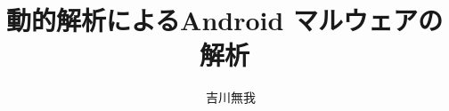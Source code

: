 
\renewcommand{\baselinestretch}{0.5}

\title{動的解析によるAndroid マルウェアの解析}
\author{~~吉川無我}

\pagestyle{headings}

\def\figlabel#1{\label{fig:#1}}
\def\tablabel#1{\label{tab:#1}}
\def\chaplabel#1{\label{chap:#1}}
\def\seclabel#1{\label{sec:#1}}
\def\applabel#1{\label{app:#1}}

\def\figref#1{図~\ref{fig:#1}}
\def\tabref#1{表~\ref{tab:#1}}
\def\chapref#1{第~\ref{chap:#1}章}
\def\secref#1{第~\ref{sec:#1}節}
\def\appref#1{付録~\ref{app:#1}}

\def\labelenumi{(\theenumi)}

\jabst{} %



\maketitle
\makejabstract


